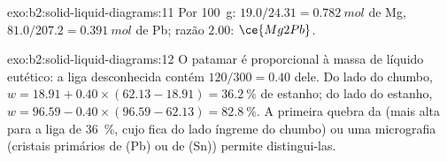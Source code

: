 \begin{solution}{exo:b2:solid-liquid-diagrams:11}
Por \qty{100}{g}: $19.0/24.31 = \qty{0.782}{mol}$ de Mg, $81.0/207.2 =
\qty{0.391}{mol}$ de Pb; razão $2.00$: $\ce{Mg2Pb}$.
\end{solution}

\begin{solution}{exo:b2:solid-liquid-diagrams:12}
O patamar é proporcional à massa de líquido eutético: a liga desconhecida
contém $120/300 = 0.40$ dele. Do lado do chumbo, $w = 18.91 + 0.40 \times (62.13 -
18.91) = 36.2~\%$ de estanho; do lado do estanho, $w = 96.59 - 0.40 \times (96.59 - 62.13) =
82.8~\%$. A primeira quebra da  (mais alta para a liga de
36~\%, cujo  fica do lado íngreme do chumbo) ou uma micrografia
(cristais primários de (Pb) ou de (Sn)) permite distingui-las.
\end{solution}


